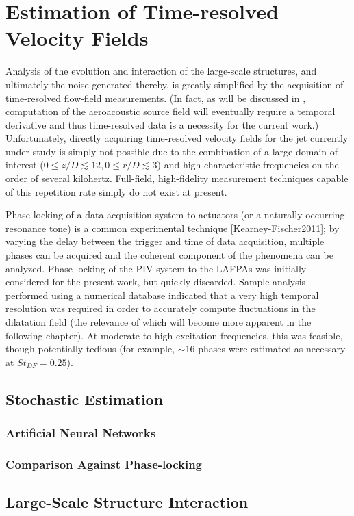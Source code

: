 \chapter{Estimation of Time-resolved Velocity Fields}
Analysis of the evolution and interaction of the large-scale structures, and ultimately the noise generated thereby, is greatly simplified by the acquisition of time-resolved flow-field measurements.
(In fact, as will be discussed in , computation of the aeroacoustic source field will eventually require a temporal derivative and thus time-resolved data is a necessity for the current work.)
Unfortunately, directly acquiring time-resolved velocity fields for the jet currently under study is simply not possible due to the combination of a large domain of interest ($0 \leq z/D \lesssim 12, 0 \leq r/D \lesssim 3$) and high characteristic frequencies on the order of several kilohertz.
Full-field, high-fidelity measurement techniques capable of this repetition rate simply do not exist at present.

Phase-locking of a data acquisition system to actuators (or a naturally occurring resonance tone) is a common experimental technique [Kearney-Fischer2011]; by varying the delay between the trigger and time of data acquisition, multiple phases can be acquired and the coherent component of the phenomena can be analyzed.
Phase-locking of the PIV system to the LAFPAs was initially considered for the present work, but quickly discarded.
Sample analysis performed using a numerical database indicated that a very high temporal resolution was required in order to accurately compute fluctuations in the dilatation field (the relevance of which will become more apparent in the following chapter).
At moderate to high excitation frequencies, this was feasible, though potentially tedious (for example, $\sim$16 phases were estimated as necessary at $St_{DF} =0.25$).
\section{Stochastic Estimation}
\subsection{Artificial Neural Networks}
\subsection{Comparison Against Phase-locking}
\section{Large-Scale Structure Interaction}